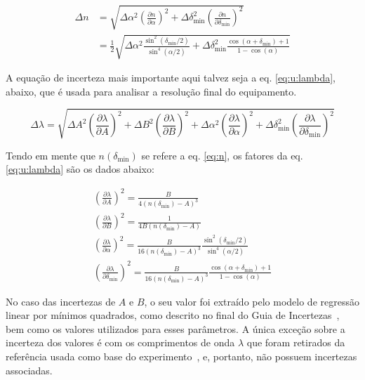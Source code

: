 \begin{align*}
    \Delta{n} &= \sqrt{
        \Delta{\alpha}^2 \left(\frac{\partial n}{\partial\alpha}\right)^2
        + \Delta{\delta^2_{\text{min}}} \left(\frac{\partial n}{\partial\delta_{\text{min}}}\right)^2
    } \\
    &= \frac{1}{2} \sqrt{
        \Delta{\alpha}^2 \frac{\sin^2(\delta_{\text{min}}/2)}{\sin^4({\alpha/2})}
        + \Delta{\delta^2_{\text{min}}} \frac{\cos(\alpha+\delta_{\text{min}})+1}{1-\cos(\alpha)}
    }
\end{align*}

A equação de incerteza mais importante aqui talvez seja a eq. \ref{eq:u:lambda}, abaixo, que é usada para analisar a resolução final do equipamento.

\begin{equation}
    \Delta{\lambda} = \sqrt{
        \Delta{A}^2 \left(\frac{\partial\lambda}{\partial A}\right)^2
        + \Delta{B}^2 \left(\frac{\partial\lambda}{\partial B}\right)^2
        + \Delta{\alpha}^2 \left(\frac{\partial\lambda}{\partial\alpha}\right)^2
        + \Delta{\delta^2_{\text{min}}} \left(\frac{\partial\lambda}{\partial \delta_{\text{min}}}\right)^2
    }
    \label{eq:u:lambda}
\end{equation}

Tendo em mente que $n(\delta_\text{min})$ se refere a eq. \ref{eq:n}, os fatores da eq. \ref{eq:u:lambda} são os dados abaixo:

\begin{gather*}
    \left(\frac{\partial\lambda}{\partial A}\right)^2 = \frac{B}{4 (n(\delta_\text{min})-A)^3} \\
    \left(\frac{\partial\lambda}{\partial B}\right)^2 = \frac{1}{4 B (n(\delta_\text{min})-A)} \\
    \left(\frac{\partial\lambda}{\partial\alpha}\right)^2 = \frac{B}{16 (n(\delta_\text{min})-A)^3} \frac{\sin^2(\delta_\text{min}/2)}{\sin^4(\alpha/2)}\\
    \left(\frac{\partial\lambda}{\partial\delta_\text{min}}\right)^2 = \frac{B}{16 (n(\delta_\text{min})-A)^3} \frac{\cos(\alpha+\delta_\text{min})+1}{1-\cos(\alpha)}
\end{gather*}

No caso das incertezas de $A$ e $B$, o seu valor foi extraído pelo modelo de regressão linear por mínimos quadrados, como descrito no final do Guia de Incertezas~\cite{ref:gum}, bem como os valores utilizados para esses parâmetros. A única exceção sobre a incerteza dos valores é com os comprimentos de onda $\lambda$ que foram retirados da referência usada como base do experimento~\cite{ref:roteiro}, e, portanto, não possuem incertezas associadas.
